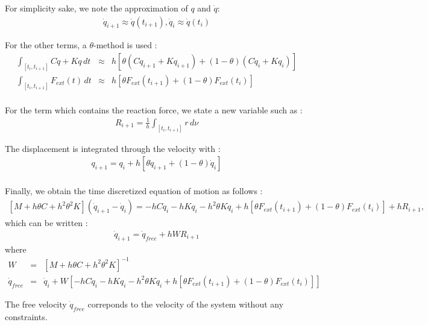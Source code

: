 \documentclass[10pt]{article}
\begin{document}
For simplicity sake, we note the approximation of $q$ and $\dot q$:
   \begin{eqnarray}
     \label{eq:20}
     \dot q_{i+1}\approx\dot q(t_{i+1}),  \dot q_{i}\approx \dot q(t_{i})
   \end{eqnarray}

 For the other terms, a $\theta$-method is used :
 \begin{eqnarray}
\int_{[t_i,t_{i+1}]}  C \dot q + K q \,dt &\approx& h\left[\theta  (C \dot q_{i+1}+K q_{i+1}) + (1-\theta) (C \dot q_{i}+K q_{i})  \right]\\
 \int_{[t_i,t_{i+1}]} F_{ext}(t) \,dt &\approx& h\left[\theta  F_{ext}(t_{i+1})+(1-\theta)  F_{ext}(t_{i})  \right]\\
 \end{eqnarray}

For the term which contains the reaction force, we state a new variable such as :
\begin{eqnarray}
  \label{eq:21}
  R_{i+1} = \frac  1 h \int_{[t_i,t_{i+1}]} r \,d\nu
\end{eqnarray}

The displacement is integrated through the velocity with :
\begin{eqnarray}
  \label{eq:22}
  q_{i+1} = q_{i} +  h\left[\theta  \dot q_{i+1}+(1-\theta)  \dot q_{i}  \right]\\
\end{eqnarray}

Finally, we obtain the time discretized equation of motion as follows :
\begin{eqnarray}
  \label{eq:23}
  \left[M+h\theta C + h^2 \theta^2 K\right] (\dot q_{i+1} - \dot q_{i}) = - h  C \dot q_{i} - h K q_{i} - h^2 \theta  K \dot q_{i}
+  h\left[\theta  F_{ext}(t_{i+1})+(1-\theta)  F_{ext}(t_{i})  \right]  +h R_{i+1},
\end{eqnarray}
which can be written :
\begin{eqnarray}
  \label{eq:24}
   \dot q_{i+1} = \dot q_{free}  + h W R_{i+1}
\end{eqnarray}
where 
\begin{eqnarray}
  W &=&   \left[M+h\theta C + h^2 \theta^2 K\right]^{-1}\\
 \dot q_{free} &=& \dot q_{i}+  W \left[   - h  C \dot q_{i} - h K q_{i} - h^2 \theta  K \dot q_{i}
+  h\left[\theta  F_{ext}(t_{i+1})+(1-\theta)  F_{ext}(t_{i})  \right]       \right]
\end{eqnarray}

The free velocity $ \dot q_{free}  $ correponds to the velocity of the system without any constraints.
\end{document}
